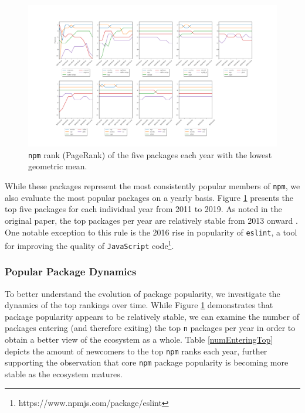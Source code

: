 \documentclass[10pt,conference]{IEEEtran}
\def\code#1{\texttt{#1}}
\begin{document}
\begin{figure}
  \includegraphics[width=1\textwidth]{figures/highest_ranked.pdf}
  \caption{\code{npm} rank (PageRank) of the five packages each year with the lowest geometric mean.}
  \label{ranksByYear}
\end{figure}

While these packages represent the most consistently popular
members of \code{npm}, we also evaluate the most popular packages
on a yearly basis. Figure \ref{ranksByYear} presents the top five packages
for each individual year from 2011 to 2019. As noted in the original paper,
the top packages per year are relatively stable from 2013 onward \cite{Wittern:2016}.
One notable exception to this rule is the 2016 rise in popularity of \code{eslint},
a tool for improving the quality of \code{JavaScript} code\footnote{https://www.npmjs.com/package/eslint}.


\subsubsection{Popular Package Dynamics}

To better understand the evolution of package popularity,
we investigate the dynamics of the top rankings over time.
While Figure \ref{ranksByYear} demonstrates that package popularity
appears to be relatively stable, we can examine the number of packages
entering (and therefore exiting) the top \code{n} packages per year in
order to obtain a better view of the ecosystem as a whole.
Table \ref{numEnteringTop} depicts the amount of newcomers to the top
\code{npm} ranks each year, further supporting the observation that
core \code{npm} package popularity is becoming more stable as the 
ecosystem matures.
\end{document}
